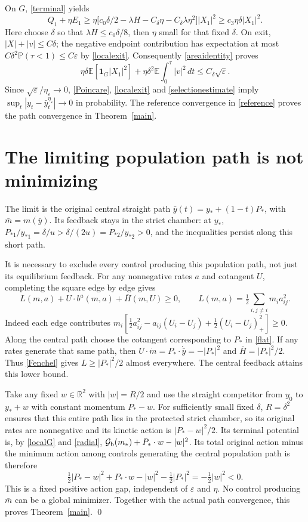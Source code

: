 \documentclass[11pt,a4paper]{article}
\newcommand{\R}{\mathbb R}
\newcommand{\E}{\mathbb E}
\newcommand{\PP}{\mathbb P}
\newcommand{\G}{\mathcal G}
\newcommand{\Hb}{\overline H}
\newcommand{\one}{\mathbf 1}
\newcommand{\dt}{\,dt}
\begin{document}
On $G$, \eqref{terminal} yields
\[
 Q_1+\eta E_1
 \geq\eta\big[c_0\delta/2-\lambda H
                   -C_\delta\eta-C_\delta\lambda\eta^2\big]|X_1|^2
 \geq c_3\eta\delta|X_1|^2.
\]
Here choose $\delta$ so that $\lambda H\leq c_0\delta/8$, then
$\eta$ small for that fixed $\delta$. On exit, $|X|+|v|\leq C\delta$;
the negative endpoint contribution has expectation at most
$C\delta^2\PP(\tau<1)\leq C\varepsilon$ by \eqref{localexit}.
Consequently \eqref{areaidentity} proves
\begin{equation}\label{selectionestimate}
 \eta\delta\E[\one_G|X_1|^2]
       +\eta\delta^2\E\int_0^\tau|v|^2\dt
             \leq C_\delta\sqrt\varepsilon.
\end{equation}
Since $\sqrt\varepsilon/\eta_\varepsilon\to0$, \eqref{Poincare},
\eqref{localexit} and \eqref{selectionestimate} imply
$\sup_t|y_t-\bar y^{\eta_\varepsilon}_t|\to0$ in probability.
The reference convergence in \eqref{reference} proves the path
convergence in Theorem~\ref{main}.

\section{The limiting population path is not minimizing}
The limit is the original central straight path
$\bar y(t)=y_*+(1-t)P_*$, with $\bar m=m(\bar y)$.
Its feedback stays in the strict chamber: at $y_*$,
$P_{*1}/y_{*1}=\delta/u>\delta/(2u)=P_{*2}/y_{*2}>0$,
and the inequalities persist along this short path.

It is necessary to exclude every control producing this population
path, not just its equilibrium feedback. For any nonnegative rates
$a$ and cotangent $U$, completing the square edge by edge gives
\begin{equation}\label{Fenchel}
 L(m,a)+U\cdot b^a(m,a)+\Hb(m,U)\geq0,
 \qquad L(m,a)=\tfrac12\sum_{i,j\ne i}m_i a_{ij}^2.
\end{equation}
Indeed each edge contributes
$m_i[\tfrac12a_{ij}^2-a_{ij}(U_i-U_j)
+\tfrac12(U_i-U_j)_+^2]\geq0$.
Along the central path choose the cotangent corresponding to $P_*$
in \eqref{flat}. If any rates generate that same path, then
$U\cdot\dot m=P_*\cdot\dot{\bar y}=-|P_*|^2$ and
$\Hb=|P_*|^2/2$. Thus \eqref{Fenchel} gives
$L\geq|P_*|^2/2$ almost everywhere. The central feedback attains
this lower bound.

Take any fixed $w\in\R^2$ with $|w|=R/2$ and use the straight
competitor from $y_0$ to $y_*+w$ with constant momentum $P_*-w$.
For sufficiently small fixed $\delta$, $R=\delta^2$ ensures that
this entire path lies in the protected strict chamber, so its original
rates are nonnegative and its kinetic action is $|P_*-w|^2/2$.
Its terminal potential is, by \eqref{localG} and \eqref{radial},
$\G_{\rm b}(m_*)+P_*\cdot w-|w|^2$.
Its total original action minus the minimum action among controls
generating the central population path is therefore
\[
 \tfrac12|P_*-w|^2+P_*\cdot w-|w|^2
                    -\tfrac12|P_*|^2=-\tfrac12|w|^2<0.
\]
This is a fixed positive action gap, independent of
$\varepsilon$ and $\eta$. No control producing $\bar m$ can be a
global minimizer. Together with the actual path convergence, this
proves Theorem~\ref{main}.
\qed
\end{document}
